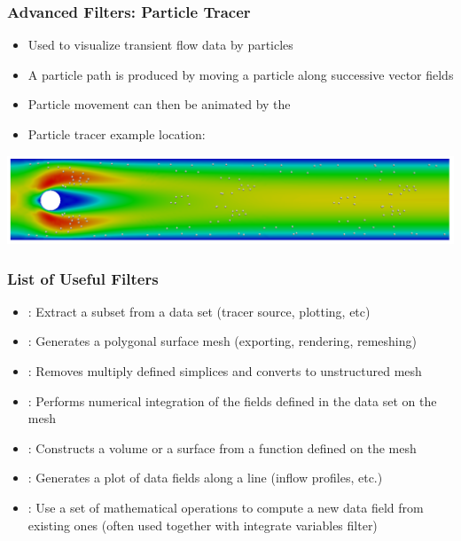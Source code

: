 \begin{frame}

  \frametitle{Advanced Filters: Particle Tracer}

    \begin{itemize}
      \item Used to visualize transient flow data by particles 
      \item A particle path is produced by moving a particle along successive vector fields 
      \item Particle movement can then be animated by the  
      \item Particle tracer example location: 
    \end{itemize}
    \includegraphics[width=\textwidth]{screenshots/particle-tracer.png}

\end{frame}

\begin{frame}

  \frametitle{List of Useful Filters}

    \begin{itemize}
      \item {}: Extract a subset from a data set (tracer source, plotting, etc)
      \item {}: Generates a polygonal surface mesh (exporting, rendering, remeshing) 
      \item {}: Removes multiply defined simplices and converts to unstructured mesh
      \item {}: Performs numerical integration of the fields defined in the data set on the mesh 
      \item {}: Constructs a volume or a surface from a function defined on the mesh 
      \item {}: Generates a plot of data fields along a line (inflow profiles, etc.) 
      \item {}: Use a set of mathematical operations to compute a new data field from existing ones (often used together with integrate variables filter)
    \end{itemize}

\end{frame}

